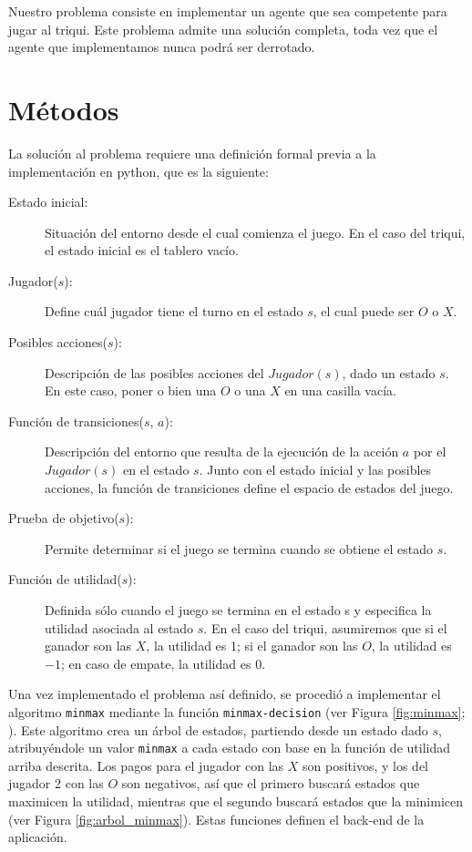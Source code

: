 \documentclass[11pt]{article}
\begin{document}
Nuestro problema consiste en implementar un agente que sea competente para jugar al triqui. Este problema admite una solución completa, toda vez que el agente que implementamos nunca podrá ser derrotado. 

\section{Métodos}

\noindent La solución al problema requiere una definición formal previa a la implementación en python, que es la siguiente:

\begin{description}
\item[Estado inicial:] Situación del entorno desde el cual comienza el juego. En el caso del triqui, el estado inicial es el tablero vacío.
\item[Jugador($s$):] Define cuál jugador tiene el turno en el estado $s$, el cual puede ser $O$ o $X$.
\item[Posibles acciones($s$):] Descripción de las posibles acciones del $Jugador(s)$, dado un estado $s$. En este caso, poner o bien una $O$ o una $X$ en una casilla vacía.
\item[Función de transiciones($s$, $a$):] Descripción del entorno que resulta de la ejecución de la acción $a$ por el $Jugador(s)$ en el estado $s$. Junto con el estado inicial y las posibles acciones, la función de transiciones define el espacio de estados del juego.
\item[Prueba de objetivo($s$):] Permite determinar si el juego se termina cuando se obtiene el estado $s$.
\item[Función de utilidad($s$):] Definida sólo cuando el juego se termina en el estado s y especifica la utilidad asociada al estado $s$. En el caso del triqui, asumiremos que si  el ganador son las $X$, la utilidad es 1; si el ganador son las $O$, la utilidad es $-1$; en caso de empate, la utilidad es 0.
\end{description}

Una vez implementado el problema así definido, se procedió a implementar el algoritmo \texttt{minmax} mediante la función \texttt{minmax-decision} (ver Figura \ref{fig:minmax}; \citealt[\S 5.2]{r_y_n2016}). Este algoritmo crea un árbol de estados, partiendo desde un estado dado $s$, atribuyéndole un valor \texttt{minmax} a cada estado con base en la función de utilidad arriba descrita. Los pagos para el jugador con las $X$ son positivos, y los del jugador 2 con las $O$ son negativos, así que el primero buscará estados que maximicen la utilidad, mientras que el segundo buscará estados que la minimicen (ver Figura \ref{fig:arbol_minmax}). Estas funciones definen el back-end de la aplicación.
\end{document}
